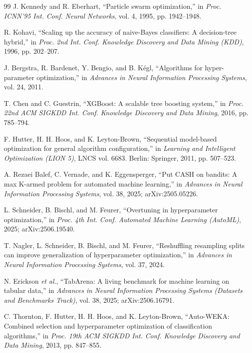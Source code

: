 \documentclass[11pt, a4paper]{article}
\begin{document}
\begin{thebibliography}{99}
 J. Kennedy and R. Eberhart, ``Particle swarm optimization,'' in \textit{Proc. ICNN'95 Int. Conf. Neural Networks}, vol. 4, 1995, pp. 1942--1948.

 R. Kohavi, ``Scaling up the accuracy of naive-Bayes classifiers: A decision-tree hybrid,'' in \textit{Proc. 2nd Int. Conf. Knowledge Discovery and Data Mining (KDD)}, 1996, pp. 202--207.

 J. Bergstra, R. Bardenet, Y. Bengio, and B. K{\'e}gl, ``Algorithms for hyper-parameter optimization,'' in \textit{Advances in Neural Information Processing Systems}, vol. 24, 2011.

 T. Chen and C. Guestrin, ``XGBoost: A scalable tree boosting system,'' in \textit{Proc. 22nd ACM SIGKDD Int. Conf. Knowledge Discovery and Data Mining}, 2016, pp. 785--794.

 F. Hutter, H. H. Hoos, and K. Leyton-Brown, ``Sequential model-based optimization for general algorithm configuration,'' in \textit{Learning and Intelligent Optimization (LION 5)}, LNCS vol. 6683. Berlin: Springer, 2011, pp. 507--523.

 A. Rezaei Balef, C. Vernade, and K. Eggensperger, ``Put CASH on bandits: A max K-armed problem for automated machine learning,'' in \textit{Advances in Neural Information Processing Systems}, vol. 38, 2025; arXiv:2505.05226.

 L. Schneider, B. Bischl, and M. Feurer, ``Overtuning in hyperparameter optimization,'' in \textit{Proc. 4th Int. Conf. Automated Machine Learning (AutoML)}, 2025; arXiv:2506.19540.

 T. Nagler, L. Schneider, B. Bischl, and M. Feurer, ``Reshuffling resampling splits can improve generalization of hyperparameter optimization,'' in \textit{Advances in Neural Information Processing Systems}, vol. 37, 2024.

 N. Erickson \textit{et al.}, ``TabArena: A living benchmark for machine learning on tabular data,'' in \textit{Advances in Neural Information Processing Systems (Datasets and Benchmarks Track)}, vol. 38, 2025; arXiv:2506.16791.

 C. Thornton, F. Hutter, H. H. Hoos, and K. Leyton-Brown, ``Auto-WEKA: Combined selection and hyperparameter optimization of classification algorithms,'' in \textit{Proc. 19th ACM SIGKDD Int. Conf. Knowledge Discovery and Data Mining}, 2013, pp. 847--855.


\end{thebibliography}
\end{document}
